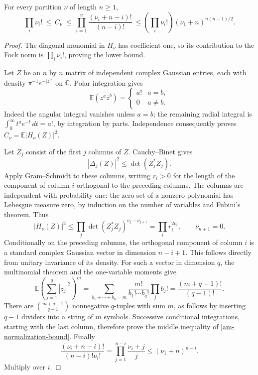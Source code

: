 \begin{theorem}\label{am-gaussian}
For every partition $\nu$ of length $n\ge1$,
\begin{equation}\label{am-normalization-bound}
 \prod_i\nu_i!\ \le\ C_\nu\ \le\
 \prod_{i=1}^n\frac{(\nu_i+n-i)!}{(n-i)!}
 \ \le\left(\prod_i\nu_i!\right)(\nu_1+n)^{n(n-1)/2}.
\end{equation}
\end{theorem}
\begin{proof}
The diagonal monomial in $H_\nu$ has coefficient one, so its contribution
to the Fock norm is $\prod_i\nu_i!$, proving the lower bound.

Let $Z$ be an $n$ by $n$ matrix of independent complex Gaussian entries,
each with density $\pi^{-1}e^{-|z|^2}$ on $\mathbb C$.
Polar integration gives
\[
 \mathbb E(z^a\overline{z}^{b})=
 \begin{cases}a!&a=b,\\0&a\ne b.\end{cases}
\]
Indeed the angular integral vanishes unless $a=b$; the remaining radial
integral is $\int_0^\infty t^ae^{-t}\,dt=a!$, by integration by parts.
Independence consequently proves
$C_\nu=\mathbb E|H_\nu(Z)|^2$.

Let $Z_j$ consist of the first $j$ columns of $Z$.
Cauchy--Binet gives
\[
           |\Delta_j(Z)|^2\le\det(Z_j^*Z_j).
\]
Apply Gram--Schmidt to these columns, writing $r_i>0$ for the length
of the component of column $i$ orthogonal to the preceding columns.
The columns are independent with probability one: the zero set of a
nonzero polynomial has Lebesgue measure zero, by induction on the
number of variables and Fubini's theorem. Thus
\[
 |H_\nu(Z)|^2
 \le\prod_j\det(Z_j^*Z_j)^{\nu_j-\nu_{j+1}}
 =\prod_i r_i^{2\nu_i},\qquad \nu_{n+1}=0.
\]
Conditionally on the preceding columns, the orthogonal component of
column $i$ is a standard complex Gaussian vector in dimension $n-i+1$.
This follows directly from unitary invariance of its density.
For such a vector in dimension $q$, the multinomial theorem and the
one-variable moments give
\[
 \mathbb E\left(\sum_{j=1}^q|z_j|^2\right)^m
 =\sum_{b_1+\cdots+b_q=m}\frac{m!}{b_1!\cdots b_q!}
                                      \prod_j b_j!
 =\frac{(m+q-1)!}{(q-1)!}.
\]
There are $\binom{m+q-1}{q-1}$ nonnegative $q$-tuples with sum $m$,
as follows by inserting $q-1$ dividers into a string of $m$ symbols.
Successive conditional integrations, starting with the last column,
therefore prove the middle inequality of \eqref{am-normalization-bound}.
Finally
\[
 \frac{(\nu_i+n-i)!}{(n-i)!\nu_i!}
          =\prod_{j=1}^{n-i}\frac{\nu_i+j}{j}
          \le(\nu_1+n)^{n-i}.
\]
Multiply over $i$.
\end{proof}

